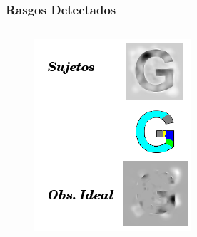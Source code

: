 \documentclass[10pt]{beamer}
\begin{document}
 	\begin{frame}
	\frametitle{Rasgos Detectados}
	\begin{columns}[t]
	\begin{figure}
	    \includegraphics[width=\textwidth]{graficos/rasgos_resultadosG.png}
	\end{figure}


\end{columns}
\end{frame}
\end{document}
